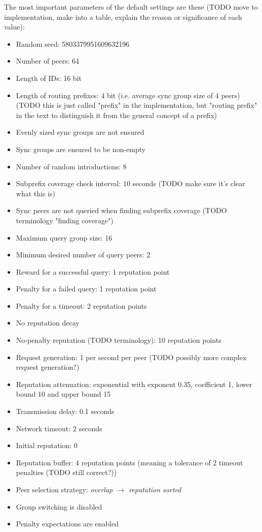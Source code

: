 The most important parameters of the default settings are these (TODO move to
implementation, make into a table, explain the reason or significance of each
value):
\begin{itemize}
\item Random seed: 5803379951609632196
\item Number of peers: 64
\item Length of IDs: 16 bit
\item Length of routing prefixes: 4 bit (i.e. average sync group size of 4
      peers) (TODO this is just called "prefix" in the implementation, but
      "routing prefix" in the text to distinguish it from the general concept of
      a prefix)
\item Evenly sized sync groups are not ensured
\item Sync groups are ensured to be non-empty
\item Number of random introductions: 8
\item Subprefix coverage check interval: 10 seconds (TODO make sure it's clear
      what this is)
\item Sync peers are not queried when finding subprefix coverage (TODO
      terminology "finding coverage")
\item Maximum query group size: 16
\item Minimum desired number of query peers: 2
\item Reward for a successful query: 1 reputation point
\item Penalty for a failed query: 1 reputation point
\item Penalty for a timeout: 2 reputation points
\item No reputation decay
\item No-penalty reputation (TODO terminology): 10 reputation points
\item Request generation: 1 per second per peer (TODO possibly more complex
      request generation?)
\item Reputation attenuation: exponential with exponent 0.35, coefficient 1,
      lower bound 10 and upper bound 15
\item Transmission delay: 0.1 seconds
\item Network timeout: 2 seconds
\item Initial reputation: 0
\item Reputation buffer: 4 reputation points (meaning a tolerance of 2 timeout
      penalties (TODO still correct?))
\item Peer selection strategy: \emph{overlap $\rightarrow$ reputation sorted}
\item Group switching is disabled
\item Penalty expectations are enabled
\end{itemize}

